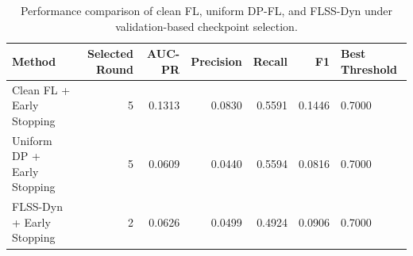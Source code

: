 \begin{table}
\caption{Performance comparison of clean FL, uniform DP-FL, and FLSS-Dyn under validation-based checkpoint selection.}
\label{tab:main_comparison}
\begin{tabular}{lrrrrr}
\toprule
Method & Selected Round & AUC-PR & Precision & Recall & F1 & Best Threshold \\
\midrule
Clean FL + Early Stopping & 5 & 0.1313 & 0.0830 & 0.5591 & 0.1446 & 0.7000 \\
Uniform DP + Early Stopping & 5 & 0.0609 & 0.0440 & 0.5594 & 0.0816 & 0.7000 \\
FLSS-Dyn + Early Stopping & 2 & 0.0626 & 0.0499 & 0.4924 & 0.0906 & 0.7000 \\
\bottomrule
\end{tabular}
\end{table}
